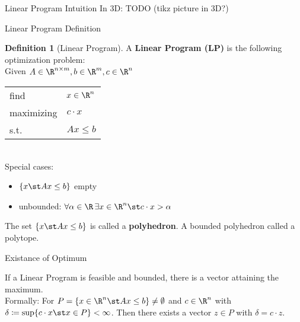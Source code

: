 \documentclass[a4paper, x11names, svgnames]{beamer}
\theoremstyle{definition}
\newtheorem*{defn}{Definition}
\theoremstyle{plain}
\theoremstyle{plain}
\begin{document}
\begin{frame}{Linear Program Intuition}
    In 3D:
    TODO (tikz picture in 3D?)

\end{frame}

\begin{frame}{Linear Program Definition}
    \begin{defn}[Linear Program]
        A \textbf{Linear Program (LP)} is the following optimization problem: \\
        \vspace*{0.3cm}
        \hspace*{0.5cm}Given $A \in \R^{n\times m}, b \in \R^m, c\in\R^n$  \\
        \hspace*{1.5cm}  %
        \begin{tabular}{l l}
            find        & $x \in\R^n$  \\  %
            maximizing  & $c\cdot x$   \\
            s.t.        & $Ax \leq b$  \\
        \end{tabular} \\
        \pause
        \vspace{0.3cm}
        Special cases: \\
        \begin{itemize}
            \item $\{x\st Ax\leq b\}$ empty
            \item unbounded: $\forall\alpha\in\R\,\exists x\in\R^n\st c\cdot x > \alpha$
        \end{itemize}
        The set $\{x \st Ax \leq b\}$ is called a \textbf{polyhedron}.
        A bounded polyhedron called a polytope.
    \end{defn}
\end{frame}

\begin{frame}{Existance of Optimum}
    \begin{theorem}
        If a Linear Program is feasible and bounded, there is a vector attaining the maximum. \\
        \pause
        Formally: For $P=\{x\in\R^n\st Ax\leq b\}\neq\emptyset$ and $c\in\R^n$
        with $\delta\coloneqq\sup\{c\cdot x\st x\in P\} < \infty$. Then there exists a vector $z\in P$
        with $\delta = c\cdot z$.
    \end{theorem}
\end{frame}
\end{document}
